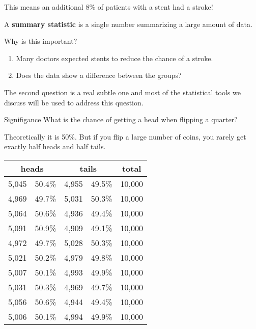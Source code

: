 \documentclass{beamer}
\begin{document}
\begin{frame}
\begin{note}
This means an additional 8\% of patients with a stent had a stroke!
\end{note}\pause

\begin{definition}
A \textbf{summary statistic} is a single number summarizing a large amount of data.
\end{definition}\pause

\begin{block}{Why is this important?}
\begin{enumerate}
\item Many doctors expected stents to reduce the chance of a stroke.\pause
\item Does the data show a  difference between the groups?
\end{enumerate}
\end{block}\pause

\begin{note}
The second question is a real subtle one and most of the statistical tools we discuss will be used to address this question.
\end{note}
\end{frame}

\begin{frame}
\begin{block}{Signifigance}
What is the chance of getting a head when flipping a quarter?\pause 

Theoretically it is 50\%. But if you flip a large number of coins, you rarely get exactly half heads and half tails.\pause

\begin{center}
\begin{tabular}{ccccc}\hline
\multicolumn{2}{c}{heads} & \multicolumn{2}{c}{tails} & total \\\hline
5,045 & 50.4\% & 4,955 & 49.5\% & 10,000\\
4,969 & 49.7\% & 5,031 & 50.3\% & 10,000\\
5,064 & 50.6\% & 4,936 & 49.4\% & 10,000\\
5,091 & 50.9\% & 4,909 & 49.1\% & 10,000\\
4,972 & 49.7\% & 5,028 & 50.3\% & 10,000\\
5,021 & 50.2\% & 4,979 & 49.8\% & 10,000\\
5,007 & 50.1\% & 4,993 & 49.9\% & 10,000\\
5,031 & 50.3\% & 4,969 & 49.7\% & 10,000\\
5,056 & 50.6\% & 4,944 & 49.4\% & 10,000\\
5,006 & 50.1\% & 4,994 & 49.9\% & 10,000\\
\end{tabular}
\end{center}
\end{block}
\end{frame}
\end{document}
